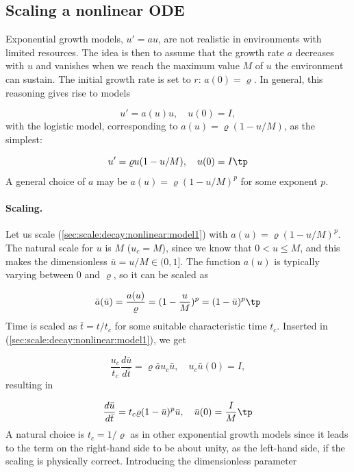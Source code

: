 \documentclass[graybox,envcountchap,sectrefs,final]{svmonodo}
\begin{document}
\subsection{Scaling a nonlinear ODE}
\label{sec:scale:decay:nonlinear}


Exponential growth models, $u'=au$, are not realistic in environments
with limited resources. The idea is then to assume that
the growth rate $a$ decreases with $u$ and vanishes when we reach the maximum
value $M$ of $u$ the environment can sustain. The initial growth rate
is set to $r$: $a(0)=\varrho$.
In general, this reasoning gives rise to models

\begin{equation}
u' = a(u)u,\quad u(0)=I,
\label{sec:scale:decay:nonlinear:model1}
\end{equation}
with the logistic model, corresponding to $a(u)=\varrho(1-u/M)$,
as the simplest:

\begin{equation}
u' = \varrho u(1-u/M),\quad u(0)=I\tp
\label{sec:scale:decay:nonlinear:model2}
\end{equation}
A general choice of $a$ may be $a(u)=\varrho(1-u/M)^p$ for some exponent $p$.


\paragraph{Scaling.}
Let us scale (\ref{sec:scale:decay:nonlinear:model1}) with
$a(u)=\varrho (1-u/M)^p$.
The natural scale for $u$ is $M$ ($u_c=M$), since we know that
$0 < u\leq M$, and this makes the dimensionless $\bar u = u/M \in (0,1]$.
The function $a(u)$ is
typically varying between 0 and $\varrho$, so it can be scaled as

\[ \bar a(\bar u) = \frac{a(u)}{\varrho} = (1 - \frac{u}{M})^p =
(1 - \bar u)^p\tp\]
Time is scaled as $\bar t = t/t_c$ for some suitable characteristic time $t_c$.
Inserted in (\ref{sec:scale:decay:nonlinear:model1}), we get

\[ \frac{u_c}{t_c}\frac{d\bar u}{d\bar t} = \varrho\bar a u_c\bar u,\quad u_c\bar u(0)=I,\]
resulting in

\[ \frac{d\bar u}{d\bar t} = t_c \varrho (1 - \bar u)^p \bar u,\quad
\bar u(0) =\frac{I}{M}\tp\]
A natural choice is $t_c =1/\varrho$ as in other exponential growth models
since it leads to the term on the right-hand side to be about unity,
as the left-hand side, if the scaling is physically correct.
Introducing the dimensionless parameter
\end{document}
